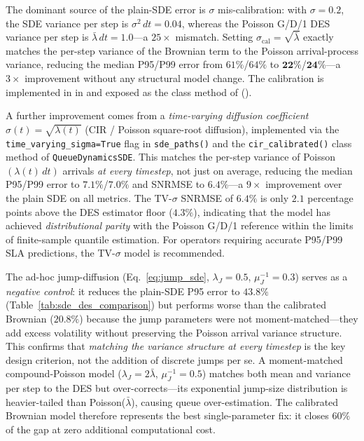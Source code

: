 \documentclass{ieeeaccess}
\begin{document}
The dominant source of the plain-SDE error is $\sigma$ mis-calibration: with $\sigma{=}0.2$, the
SDE variance per step is $\sigma^2\,dt=0.04$, whereas the Poisson G/D/1 DES variance per step is
$\bar\lambda\,dt=1.0$---a $25\times$ mismatch. Setting $\sigma_{\mathrm{cal}}=\sqrt{\bar\lambda}$
exactly matches the per-step variance of the Brownian term to the Poisson arrival-process variance,
reducing the median P95/P99 error from $61\%$/$64\%$ to $\mathbf{22\%}$/$\mathbf{24\%}$---a
$3\times$ improvement without any structural model change. The calibration is implemented in
 in  and exposed as the
 class method of 
().

A further improvement comes from a \emph{time-varying diffusion coefficient}
$\sigma(t){=}\sqrt{\lambda(t)}$ (CIR / Poisson square-root diffusion), implemented via
the \texttt{time\_varying\_sigma=True} flag in \texttt{sde\_paths()} and the
\texttt{cir\_calibrated()} class method of \texttt{QueueDynamicsSDE}. This matches the
per-step variance of Poisson$(\lambda(t)\,dt)$ arrivals \emph{at every timestep}, not just
on average, reducing the median P95/P99 error to $\mathbf{7.1\%}$/$\mathbf{7.0\%}$ and
SNRMSE to $\mathbf{6.4\%}$---a $9\times$ improvement over the plain SDE on all metrics.
The TV-$\sigma$ SNRMSE of $6.4\%$ is only $2.1$ percentage points above the DES estimator
floor ($4.3\%$), indicating that the model has achieved \emph{distributional parity} with
the Poisson G/D/1 reference within the limits of finite-sample quantile estimation.
For operators requiring accurate P95/P99 SLA predictions, the TV-$\sigma$ model is recommended.

The ad-hoc jump-diffusion (Eq.~\ref{eq:jump_sde}, $\lambda_J=0.5$, $\mu_J^{-1}=0.3$) serves
as a \emph{negative control}: it reduces the plain-SDE P95 error to $43.8\%$ (Table~\ref{tab:sde_des_comparison}) but performs worse than the calibrated Brownian ($20.8\%$) because
the jump parameters were not moment-matched---they add excess volatility without preserving the
Poisson arrival variance structure. This confirms that \emph{matching the variance structure at
every timestep} is the key design criterion, not the addition of discrete jumps per se. A moment-matched compound-Poisson model ($\lambda_J=2\bar\lambda$,
$\mu_J^{-1}=0.5$) matches both mean and variance per step to the DES but over-corrects---its
exponential jump-size distribution is heavier-tailed than Poisson($\bar\lambda$), causing queue
over-estimation. The calibrated Brownian model therefore represents the best single-parameter fix:
it closes $60\%$ of the gap at zero additional computational cost.
\end{document}
